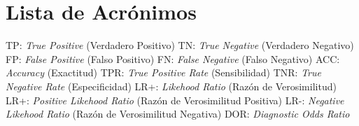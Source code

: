 \thispagestyle{empty}
\section*{Lista de Acrónimos}

TP: \textit{True Positive} (Verdadero Positivo)
\medbreak
TN: \textit{True Negative} (Verdadero Negativo)
\medbreak
FP: \textit{False Positive} (Falso Positivo)
\medbreak
FN: \textit{False Negative} (Falso Negativo)
\medbreak
ACC: \textit{Accuracy} (Exactitud)
\medbreak
TPR: \textit{True Positive Rate} (Sensibilidad)
\medbreak
TNR: \textit{True Negative Rate} (Especificidad)
\medbreak
LR+: \textit{Likehood Ratio} (Razón de Verosimilitud)
\medbreak
LR+: \textit{Positive Likehood Ratio} (Razón de Verosimilitud Positiva)
\medbreak
LR-: \textit{Negative Likehood Ratio} (Razón de Verosimilitud Negativa)
\medbreak
DOR: \textit{Diagnostic Odds Ratio}

\clearpage
